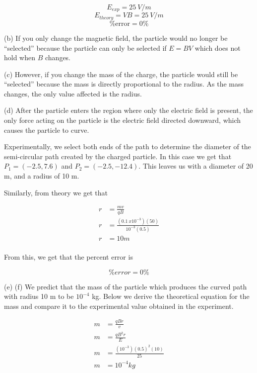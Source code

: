 \documentclass[12pt]{article}
\begin{document}
\[E_{exp} = \SI{25}{V/m}\]
\[E_{theory} = VB = \SI{25}{V/m}\]
\[\text{\% error} = 0 \% \]

(b) If you only change the magnetic field, the particle would no longer be ``selected'' because the particle can only be selected if $E=BV$ which does not hold when $B$ changes.

\bigskip

(c) However, if you change the mass of the charge, the particle would still be ``selected'' because  the mass is directly proportional to the radius. As the mass changes, the only value affected is the radius.

\bigskip

(d) After the particle enters the region where only the electric field is present, the only force acting on the particle is the electric field directed downward, which causes the particle to curve.

Experimentally, we select both ends of the path to determine the diameter of the semi-circular path created by the charged particle. In this case we get that $P_1 = (-2.5, 7.6)$ and $P_2 = (-2.5, -12.4)$. This leaves us with a diameter of 20 m, and a radius of 10 m.

Similarly, from theory we get that


\begin{equation*}
    \begin{split}
        r &= \frac{mv}{qB} \\
        r &= \frac{(\SI{0.1}{x10^{-3}})(50)}{10^{-3}(0.5)} \\
        r &= 10 m \\
    \end{split}
\end{equation*}

From this, we get that the percent error is

\[\% error = 0\%\]

\bigskip

(e) (f) We predict that the mass of the particle which produces the curved path with radius 10 m to be $10^{-4}$ kg.
Below we derive the theoretical equation for the mass and compare it to the experimental value obtained in the experiment.

\begin{equation*}
    \begin{split}
        m &= \frac{qBr}{v} \\
        m &= \frac{qB^2r}{E} \\
        m &= \frac{(10^{-3})(0.5)^2(10)}{25} \\
        m &= 10^{-4} kg \\
    \end{split}
\end{equation*}
\end{document}
